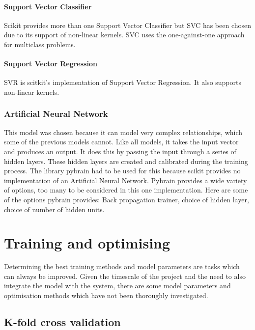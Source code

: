 \paragraph*{Support Vector Classifier}
Scikit provides more than one Support Vector Classifier but SVC has been chosen due to its support of non-linear kernels. SVC uses the one-against-one approach for multiclass problems.

\paragraph*{Support Vector Regression}
SVR is scitkit's implementation of Support Vector Regression. It also supports non-linear kernels.

\subsubsection{Artificial Neural Network}
This model was chosen because it can model very complex relationships, which some of the previous models cannot. Like all models, it takes the input vector and produces an output. It does this by passing the input through a series of hidden layers. These hidden layers are created and calibrated during the training process. The library pybrain had to be used for this because scikit provides no implementation of an Artificial Neural Network.
Pybrain provides a wide variety of options, too many to be considered in this one implementation. Here are some of the options pybrain provides: Back propagation trainer, choice of hidden layer, choice of number of hidden units.

\section{Training and optimising}
Determining the best training methods and model parameters are tasks which can always be improved. Given the timescale of the project and the need to also integrate the model with the system, there are some model parameters and optimisation methods which have not been thoroughly investigated.

\subsection{K-fold cross validation}
